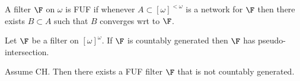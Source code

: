 \documentclass{article}
\begin{document}
\begin{defn}
    A filter \(\F\) on \(\omega\) is FUF if whenever \(A \subset [\omega]^{<\omega}\) is a network for \(\F\) then there exists \(B \subset A\) such that \(B\) converges wrt to \(\F\).
\end{defn}
\begin{lem}
    Let \(\F\) be a filter on \([\omega]^{\omega}\). If \(\F\) is countably generated then \(\F\) has pseudo-intersection.
\end{lem}

\begin{prop}
\label{prop: uncountable FUF filter}
    Assume CH. Then there exists a FUF filter \(\F\) that is not countably generated.
\end{prop}
\end{document}
